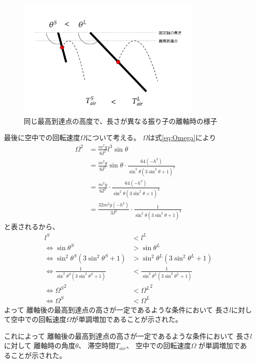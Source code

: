 \documentclass[a4paper,11pt]{jsarticle}
\begin{document}
\begin{figure}[h]
  \centering
  \includegraphics[width = 0.8\textwidth]{same_max_height.png}
  \caption{同じ最高到達点の高度で、長さが異なる振り子の離軸時の様子}
  \label{same_max_height.png}
\end{figure}

最後に空中での回転速度$\Omega$について考える。
$\Omega$は式\ref{eq:Omega}により
\begin{align}
  \Omega^2 
  &= \frac{m^2g}{6I^2}l^3\sin\theta
  \\
  &= \frac{m^2g}{6I^2}\sin\theta \cdot \frac{64(-h^3)}{\sin^3\theta(3\sin^2\theta+1)^3}
  \\
  &= \frac{m^2g}{6I^2}\cdot \frac{64(-h^3)}{\sin^2\theta(3\sin^2\theta+1)^3}
  \\
  &= \frac{32m^2g (-h^3)}{3I^2}\cdot \frac{1}{\sin^2\theta(3\sin^2\theta+1)^3}
\end{align}
と表されるから、
\begin{align}
  l^S &< l^L
  \\
  \Leftrightarrow
  \sin\theta^S &> \sin\theta^L
  \\
  \Leftrightarrow
  \sin^2\theta^S(3\sin^2\theta^S + 1) &> \sin^2\theta^L(3\sin^2\theta^L + 1)
  \\
  \Leftrightarrow
  \frac{1}{\sin^2\theta^S(3\sin^2\theta^S + 1)} &< \frac{1}{\sin^2\theta^L(3\sin^2\theta^L + 1)}
  \\
  \Leftrightarrow
  {\Omega^S}^2 &< {\Omega^L}^2
  \\
  \Leftrightarrow
  \Omega^S &< \Omega^L
\end{align}
よって
離軸後の最高到達点の高さが一定であるような条件において
長さ$l$に対して空中での回転速度$\Omega$が単調増加であることが示された。

これによって
離軸後の最高到達点の高さが一定であるような条件において
長さ$l$に対して
離軸時の角度$\theta$、
滞空時間$T_{air}$、
空中での回転速度$\Omega$
が単調増加であることが示された。
\end{document}
